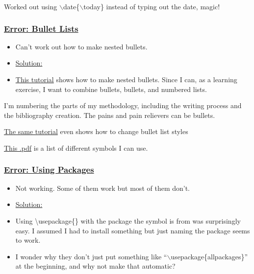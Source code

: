 \documentclass[12pt]{article}
\begin{document}
Worked out using $\backslash$date\{$\backslash$today\} instead of typing out the date, magic!

\subsubsection{\texorpdfstring{\underline{Error: Bullet Lists}}{}}\label{error:er2}
\begin{itemize}
    \item Can’t work out how to make nested bullets.
\end{itemize}
\begin{itemize}
\renewcommand{\labelitemi}{}
\item \underline{Solution:}
\renewcommand{\labelitemi}{$\bullet$}
    \item \href{https://www.overleaf.com/learn/latex/Lists}{This tutorial} shows how to make nested bullets. Since I can, as a learning exercise, I want to combine bullets, bullets, and numbered lists.
\end{itemize}

I’m numbering the parts of my methodology, including the writing process and the bibliography creation. The pains and pain relievers can be bullets.

\href{https://www.overleaf.com/learn/latex/Lists}{The same tutorial} even shows how to change bullet list styles

\href{http://www.rpi.edu/dept/arc/training/latex/LaTeX_symbols.pdf}{This .pdf} is a list of different symbols I can use. 

\subsubsection{\texorpdfstring{\underline{Error: Using Packages}}{}}\label{error:er3}
\begin{itemize}
    \item Not working. Some of them work but most of them don’t.
\end{itemize}
\begin{itemize}
\renewcommand{\labelitemi}{}
\item \underline{Solution:}
\renewcommand{\labelitemi}{$\bullet$}
    \item Using \textbackslash usepackage\{\} with the package the symbol is from was surprisingly easy. I assumed I had to install something but just naming the package seems to work. 
    \item I wonder why they don’t just put something like “$\backslash$usepackage\{allpackages\}” at the beginning, and why not make that automatic?
\end{itemize}
    
\end{document}
